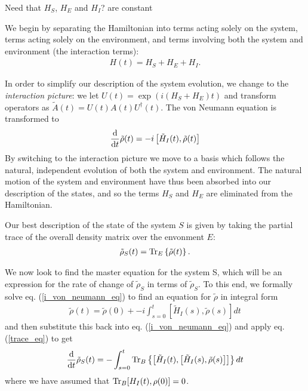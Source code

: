 Need that $H_S$, $H_E$ and $H_I$? are constant

We begin by separating the Hamiltonian into terms acting solely on the system, terms acting solely on the environment, and terms involving both the system and environment (the interaction terms):
\begin{align}
  H(t) = H_S + H_E + H_I.
\end{align}

In order to simplify our description of the system evolution, we change to the \textit{interaction picture}: we let $U(t) = \exp(i(H_S + H_E)t)$ and transform operators as $\tilde{A}(t) = U(t)A(t)U^\dagger(t)$. The von Neumann equation is transformed to
\begin{align}
  \label{i_von_neumann_eq}
  \frac{\mathrm{d}}{\mathrm{d}t} \tilde{\rho}(t) = -i\left[ \tilde{H}_I(t), \tilde{\rho}(t) \right]
\end{align}
By switching to the interaction picture we move to a basis which follows the natural, independent evolution of both the system and environment. The natural motion of the system and environment have thus been absorbed into our description of the states, and so the terms $H_S$ and $H_E$ are eliminated from the Hamiltonian.

Our best description of the state of the system $S$ is given by taking the partial trace of the overall density matrix over the envonment $E$:
\begin{align}
  \label{trace_eq}
  \tilde{\rho}_S(t) = \operatorname{Tr}_E\left\{\tilde{\rho}(t)\right\}.
\end{align}

We now look to find the master equation for the system S, which will be an expression for the rate of change of $\tilde{\rho}_S$ in terms of $\tilde{\rho}_S$. To this end, we formally solve eq. (\ref{i_von_neumann_eq}) to find an equation for $\tilde{\rho}$ in integral form
\begin{align}
  \tilde{\rho}(t) = \tilde{\rho}(0) + -i\int_{s=0}^t \left[ \tilde{H}_I(s), \tilde{\rho}(s) \right] dt
\end{align}
and then substitute this back into eq. (\ref{i_von_neumann_eq}) and apply eq. (\ref{trace_eq}) to get
\begin{align}
  \label{before_markov_approx}
  \frac{\mathrm{d}}{\mathrm{d}t} \tilde{\rho}_S(t) = -\int_{s=0}^t \operatorname{Tr}_B\left\{ \left[ \tilde{H}_I(t), \left[ \tilde{H}_I(s), \tilde{\rho}(s) \right] \right] \right\} dt
\end{align}
where we have assumed that $\operatorname{Tr}_B [H_I(t), \rho(0)] = 0$.



